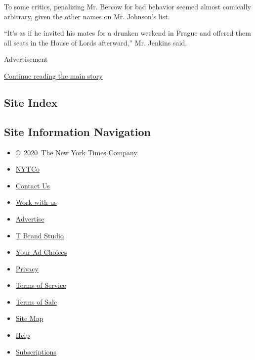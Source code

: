 To some critics, penalizing Mr. Bercow for bad behavior seemed almost
comically arbitrary, given the other names on Mr. Johnson's list.

``It's as if he invited his mates for a drunken weekend in Prague and
offered them all seats in the House of Lords afterward,'' Mr. Jenkins
said.

Advertisement

\protect\hyperlink{after-bottom}{Continue reading the main story}

\hypertarget{site-index}{%
\subsection{Site Index}\label{site-index}}

\hypertarget{site-information-navigation}{%
\subsection{Site Information
Navigation}\label{site-information-navigation}}

\begin{itemize}
\tightlist
\item
  \href{https://help.nytimes3xbfgragh.onion/hc/en-us/articles/115014792127-Copyright-notice}{©~2020~The
  New York Times Company}
\end{itemize}

\begin{itemize}
\tightlist
\item
  \href{https://www.nytco.com/}{NYTCo}
\item
  \href{https://help.nytimes3xbfgragh.onion/hc/en-us/articles/115015385887-Contact-Us}{Contact
  Us}
\item
  \href{https://www.nytco.com/careers/}{Work with us}
\item
  \href{https://nytmediakit.com/}{Advertise}
\item
  \href{http://www.tbrandstudio.com/}{T Brand Studio}
\item
  \href{https://www.nytimes3xbfgragh.onion/privacy/cookie-policy\#how-do-i-manage-trackers}{Your
  Ad Choices}
\item
  \href{https://www.nytimes3xbfgragh.onion/privacy}{Privacy}
\item
  \href{https://help.nytimes3xbfgragh.onion/hc/en-us/articles/115014893428-Terms-of-service}{Terms
  of Service}
\item
  \href{https://help.nytimes3xbfgragh.onion/hc/en-us/articles/115014893968-Terms-of-sale}{Terms
  of Sale}
\item
  \href{https://spiderbites.nytimes3xbfgragh.onion}{Site Map}
\item
  \href{https://help.nytimes3xbfgragh.onion/hc/en-us}{Help}
\item
  \href{https://www.nytimes3xbfgragh.onion/subscription?campaignId=37WXW}{Subscriptions}
\end{itemize}
